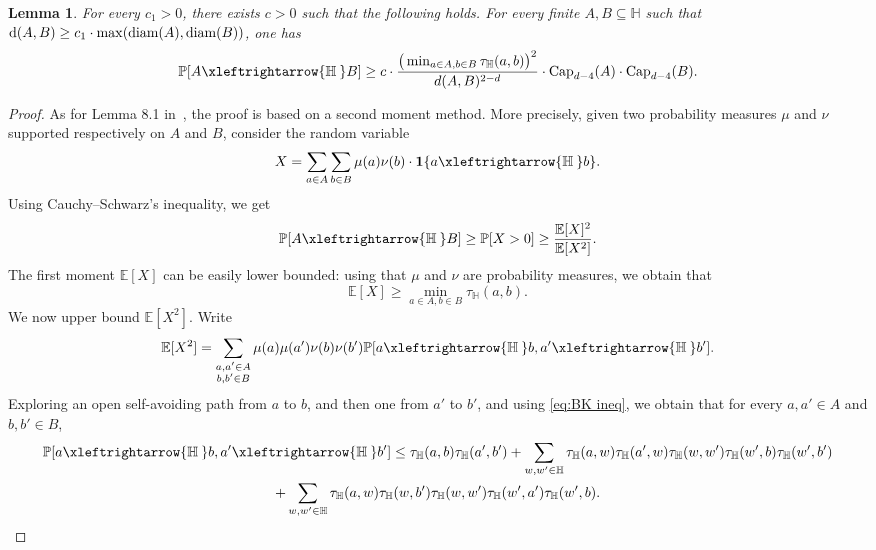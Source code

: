 \documentclass[11pt,a4paper]{article}
\numberwithin{equation}{section}
\theoremstyle{plain}
\newtheorem{Lem}[Thm]{Lemma}
\theoremstyle{definition}
\newcommand{\connect}{\xleftrightarrow}
\begin{document}
\begin{Lem}\label{lem:2sets}
For every $c_1>0$, there exists $c>0$ such that the following holds. For every finite $A, B\subseteq \mathbb H$ such that $\textup{d}(A,B) \ge c_1\cdot \max(\textup{diam}(A),\textup{diam}(B))$, one has
\begin{equation}
\mathbb P[A\connect{\mathbb H\:} B] \geq c \cdot \frac{\big(\min_{a\in A,b\in B} \tau_{\mathbb H}(a,b)\big)^2}{d(A,B)^{2-d}} \cdot \textup{Cap}_{d-4}(A)\cdot \textup{Cap}_{d-4}(B).
\end{equation}
\end{Lem}
\begin{proof} 
As for Lemma 8.1 in~\cite{Asselah2025capacity}, the proof is based on a second moment method. More precisely, given two probability measures $\mu$ and $\nu$ supported respectively on $A$ and $B$, consider the random variable
\begin{equation}
	X = \sum_{a\in A} \sum_{b\in B} \mu(a)\nu(b)\cdot \mathbf 1\{a\connect{\mathbb H\:} b\}.  
\end{equation}
Using Cauchy--Schwarz's inequality, we get 
\begin{equation}\label{CSineq}
\mathbb P[A\connect{\mathbb H\:} B] \ge \mathbb P[X>0] \ge \frac{\mathbb E[X]^2}{\mathbb E[X^2]}.
\end{equation}
The first moment $\mathbb E[X]$ can be easily lower bounded: using that $\mu$ and $\nu$ are probability measures, we obtain that 
\begin{equation}\label{firstmoment}
\mathbb E[X] \ge \min_{a\in A,b\in B} \tau_{\mathbb H}(a,b).
\end{equation}
We now upper bound $\mathbb E[X^2]$. Write
\begin{equation}
\mathbb E[X^2]  =\sum_{\substack{a,a'\in A\\ b,b'\in B}} \mu(a)\mu(a')\nu(b)\nu(b')\mathbb P[a\connect{\mathbb H\:} b, a'\connect{\mathbb H\:} b'].
\end{equation}
Exploring an open self-avoiding path from $a$ to $b$, and then one from $a'$ to $b'$, and using \eqref{eq:BK ineq}, we obtain that for every $a,a'\in A$ and $b,b'\in B$, 
\begin{multline}\label{eq.aa'bb'}
 \mathbb P[a\connect{\mathbb H\:}b, a'\connect{\mathbb H\:}b']   \le \tau_{\mathbb H}(a,b)  \tau_{\mathbb H}(a',b') 
   + \sum_{w,w'\in \mathbb H} \tau_{\mathbb H}(a,w)\tau_{\mathbb H}(a',w)  \tau_{\mathbb H}(w,w')\tau_{\mathbb H}(w',b)\tau_{\mathbb H}(w',b') 
  \\+ \sum_{w,w'\in \mathbb H}\tau_{\mathbb H}(a,w)\tau_{\mathbb H}(w,b')\tau_{\mathbb H}(w,w') \tau_{\mathbb H}(w',a')\tau_{\mathbb H}(w',b). 

\end{multline}
\end{proof}
\end{document}
